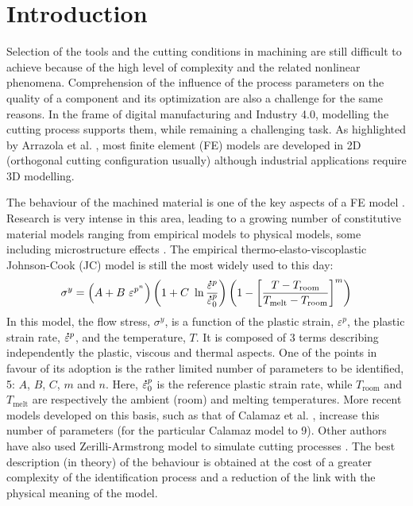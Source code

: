 \documentclass[preprint,12pt,times]{elsarticle}
\newcommand{\mdot}[1]{\accentset{\mbox{\bfseries .}}{#1}} %
\begin{document}
\linenumbers

\section{Introduction}
\label{Intro}

Selection of the tools and the cutting conditions in machining are still difficult to achieve because of the high level of complexity and the related nonlinear phenomena. Comprehension of the influence of the process parameters on the quality of a component and its optimization are also a challenge for the same reasons. In the frame of digital manufacturing and Industry 4.0, modelling the cutting process supports them, while remaining a challenging task. As highlighted by Arrazola et al. \cite{arrazola_Recent_2013}, most finite element (FE) models are developed in 2D (orthogonal cutting configuration usually) although industrial applications require 3D modelling.

The behaviour of the machined material is one of the key aspects of a FE model \cite{arrazola_Recent_2013, melkote_Advances_2017}. Research is very intense in this area, leading to a growing number of constitutive material models ranging from empirical models to physical models, some including microstructure effects \cite{melkote_Advances_2017}. The empirical thermo-elasto-viscoplastic Johnson-Cook (JC) model \cite{johnson_Constitutive_1983} is still the most widely used to this day:
%
\begin{equation}\label{eq:J-C}
	\sigma^y = \left(A + B\ \varepsilon^{p^n} \right) \left(1 + C\ \ln\frac{\mdot{\varepsilon}^p}{\mdot{\varepsilon}_0^p}\right) \left(1 - \left[\frac{T - T_{\text{room}}}{T_{\text{melt}} - T_{\text{room}}}\right]^{m}\right)
\end{equation}
%
In this model, the flow stress, $\sigma^y$, is a function of the plastic strain, $\varepsilon^p$, the plastic strain rate, $\mdot{\varepsilon}^p$, and the temperature, $T$. It is composed of 3 terms describing independently the plastic, viscous and thermal aspects. One of the points in favour of its adoption is the rather limited number of parameters to be identified, 5: $A$, $B$, $C$, $m$ and $n$. Here, $\mdot{\varepsilon}_0^p$ is the reference plastic strain rate, while $T_{\text{room}}$ and $T_{\text{melt}}$ are respectively the ambient (room) and melting temperatures. More recent models developed on this basis, such as that of Calamaz et al. \cite{calamaz_New_2008}, increase this number of parameters (for the particular Calamaz model to 9). Other authors have also used Zerilli-Armstrong model to simulate cutting processes \cite{Muralli-2017-Performance}. The best description (in theory) of the behaviour is obtained at the cost of a greater complexity of the identification process and a reduction of the link with the physical meaning of the model.
\end{document}
